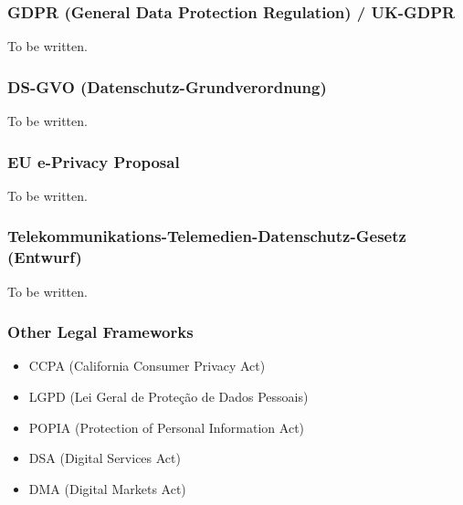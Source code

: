 \subsubsection{GDPR (General Data Protection Regulation) / UK-GDPR}

To be written.

\subsubsection{DS-GVO (Datenschutz-Grundverordnung)}

To be written.

\subsubsection{EU e-Privacy Proposal}

To be written.

\subsubsection{Telekommunikations-Telemedien-Datenschutz-Gesetz (Entwurf)}

To be written.

\subsubsection{Other Legal Frameworks}

\begin{itemize}
 \item CCPA (California Consumer Privacy Act)
 \item LGPD (Lei Geral de Proteção de Dados Pessoais)
 \item POPIA (Protection of Personal Information Act)
 \item DSA (Digital Services Act)
 \item DMA (Digital Markets Act)
\end{itemize}


